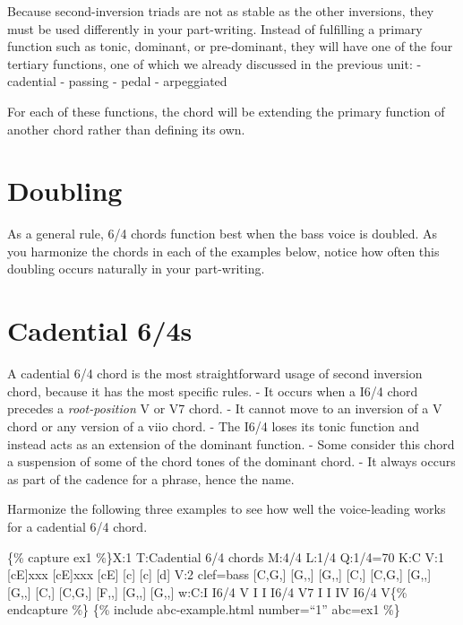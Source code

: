 \documentclass{book}
\begin{document}
Because second-inversion triads are not as stable as the other inversions,
they must be used differently in your part-writing. Instead of fulfilling a
primary function such as tonic, dominant, or pre-dominant, they will have one
of the four tertiary functions, one of which we already discussed in the
previous unit: - cadential - passing - pedal - arpeggiated

For each of these functions, the chord will be extending the primary function
of another chord rather than defining its own.

\hypertarget{doubling-1}{%
\section{Doubling}\label{doubling-1}}

As a general rule, 6/4 chords function best when the bass voice is doubled. As
you harmonize the chords in each of the examples below, notice how often this
doubling occurs naturally in your part-writing.

\hypertarget{cadential-64s}{%
\section{Cadential 6/4s}\label{cadential-64s}}

A cadential 6/4 chord is the most straightforward usage of second inversion
chord, because it has the most specific rules. - It occurs when a I6/4 chord
precedes a \emph{root-position} V or V7 chord. - It cannot move to an
inversion of a V chord or any version of a viio chord. - The I6/4 loses its
tonic function and instead acts as an extension of the dominant function. -
Some consider this chord a suspension of some of the chord tones of the
dominant chord. - It always occurs as part of the cadence for a phrase, hence
the name.

Harmonize the following three examples to see how well the voice-leading works
for a cadential 6/4 chord.

\{\% capture ex1 \%\}X:1 T:Cadential 6/4 chords M:4/4 L:1/4 Q:1/4=70 K:C V:1
{[}cE{]}xxx\textbar\textbar{} {[}cE{]}xxx\textbar\textbar{} {[}cE{]} {[}c{]}
{[}c{]} {[}d{]}\textbar{]} V:2 clef=bass {[}C,G,{]} {[}G,,{]} {[}G,,{]}
{[}C,{]}\textbar\textbar{} {[}C,G,{]} {[}G,,{]} {[}G,,{]}
{[}C,{]}\textbar\textbar{} {[}C,G,{]} {[}F,,{]} {[}G,,{]} {[}G,,{]}\textbar{]}
w:C:I I6/4 V I I I6/4 V7 I I IV I6/4 V\{\% endcapture \%\} \{\% include
abc-example.html number=``1'' abc=ex1 \%\}
\end{document}
